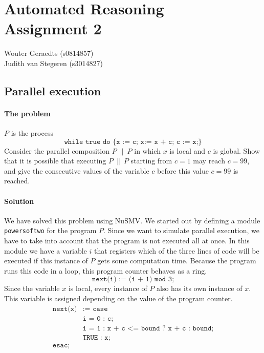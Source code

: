 \documentclass[12pt]{article}
\begin{document}
\section*{Automated Reasoning\\Assignment 2}

\begin{center}
Wouter Geraedts (s0814857) \\
Judith van Stegeren (s3014827)\\
\end{center}

\vspace{8mm}

\subsection*{Parallel execution}
\paragraph{The problem}
$P$ is the process
\[\texttt{while true do \{x := c; x:= x + c; c := x;\}}\]
Consider the parallel composition $P~\|~P$ in which $x$ is 
local and $c$ is global.
Show that it is possible that executing $P~\|~P$ starting from 
$c=1$ may reach $c=99$, 
and give the consecutive values of the variable $c$ 
before this value $c=99$ is reached.

\paragraph{Solution}
We have solved this problem using NuSMV. 
We started out by defining a module \texttt{powersoftwo} for the program $P$.
Since we want to simulate parallel execution, 
we have to take into account that the program is not executed all at once. 
In this module we have a variable $i$ 
that registers which of the three lines of code will be executed 
if this instance of $P$ gets some computation time.
Because the program runs this code in a loop, this program counter behaves as a ring.
\[\texttt{next(i) := (i + 1) mod 3;}\]
Since the variable $x$ is local, every instance of $P$ also has its own instance of $x$.
This variable is assigned depending on the value of the program counter.
\[
    \begin{array}{ll}
        \texttt{next(x)} & \texttt{:= case} \\
            & \texttt{i = 0 : c;} \\
            & \texttt{i = 1 : x + c <= bound ? x + c : bound;} \\
            & \texttt{TRUE : x;}\\
        \texttt{esac;}
    \end{array}
\]
\end{document}
